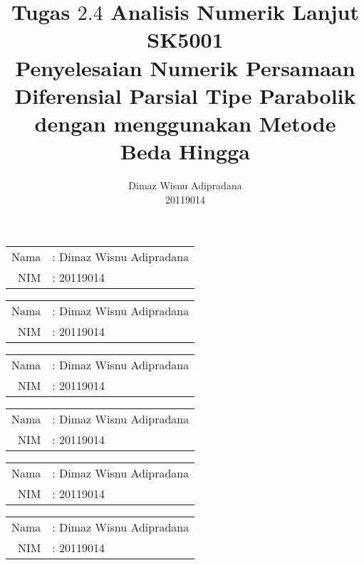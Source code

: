 \documentclass[11pt,a4paper]{article}
\author{Dimaz Wisnu Adipradana\\ 20119014}
\title{Tugas $2.4$ Analisis Numerik Lanjut SK5001 \\
	\textbf{Penyelesaian Numerik Persamaan Diferensial Parsial Tipe Parabolik dengan menggunakan Metode Beda Hingga}}
\date{}
\theoremstyle{plain}
\theoremstyle{definition}
\theoremstyle{remark}
\begin{document}
\pagestyle{fancy}
\fancyhf{}
\rfoot{\thepage}
\renewcommand{\headrulewidth}{0pt}
\renewcommand{\footrulewidth}{0pt}

 
\begin{flushright}
\begin{tabular}{rl}
Nama &: Dimaz Wisnu Adipradana\\
NIM  &: 20119014 
\end{tabular}
\end{flushright}


\newpage
 
\begin{flushright}
	\begin{tabular}{rl}
		Nama &: Dimaz Wisnu Adipradana\\
		NIM  &: 20119014 
	\end{tabular}
\end{flushright}

\newpage
 
\begin{flushright}
	\begin{tabular}{rl}
		Nama &: Dimaz Wisnu Adipradana\\
		NIM  &: 20119014 
	\end{tabular}
\end{flushright}


\newpage
 
\begin{flushright}
	\begin{tabular}{rl}
		Nama &: Dimaz Wisnu Adipradana\\
		NIM  &: 20119014 
	\end{tabular}
\end{flushright}


\newpage
 
\begin{flushright}
	\begin{tabular}{rl}
		Nama &: Dimaz Wisnu Adipradana\\
		NIM  &: 20119014 
	\end{tabular}
\end{flushright}


\newpage
 
\begin{flushright}
	\begin{tabular}{rl}
		Nama &: Dimaz Wisnu Adipradana\\
		NIM  &: 20119014 
	\end{tabular}
\end{flushright}
\end{document}

